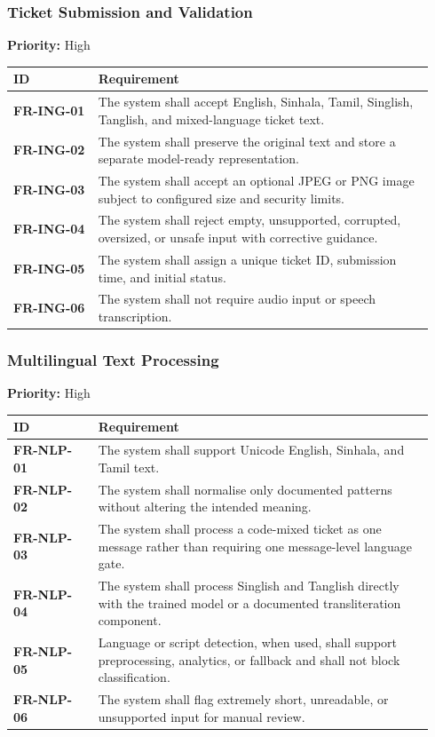 \documentclass[10pt,letterpaper]{article}
\newcommand{\req}[1]{\textbf{#1}}
\newcommand{\priority}[1]{\textbf{Priority:} #1}
\newenvironment{requirements}{%
  \small\setlength{\tabcolsep}{4pt}%
  \begin{longtable}{|L{0.19\linewidth}|L{0.75\linewidth}|}
  \hline\textbf{ID} & \textbf{Requirement}\\\hline\endhead}{\hline\end{longtable}}
\newenvironment{templatebody}{\par\justifying\setlength{\emergencystretch}{3em}}{\par}
\begin{document}
\begin{templatebody}
\subsubsection{Ticket Submission and Validation}
\priority{High}
\begin{requirements}
\req{FR-ING-01} & The system shall accept English, Sinhala, Tamil, Singlish, Tanglish, and mixed-language ticket text.\\
\req{FR-ING-02} & The system shall preserve the original text and store a separate model-ready representation.\\
\req{FR-ING-03} & The system shall accept an optional JPEG or PNG image subject to configured size and security limits.\\
\req{FR-ING-04} & The system shall reject empty, unsupported, corrupted, oversized, or unsafe input with corrective guidance.\\
\req{FR-ING-05} & The system shall assign a unique ticket ID, submission time, and initial status.\\
\req{FR-ING-06} & The system shall not require audio input or speech transcription.\\
\end{requirements}

\subsubsection{Multilingual Text Processing}
\priority{High}
\begin{requirements}
\req{FR-NLP-01} & The system shall support Unicode English, Sinhala, and Tamil text.\\
\req{FR-NLP-02} & The system shall normalise only documented patterns without altering the intended meaning.\\
\req{FR-NLP-03} & The system shall process a code-mixed ticket as one message rather than requiring one message-level language gate.\\
\req{FR-NLP-04} & The system shall process Singlish and Tanglish directly with the trained model or a documented transliteration component.\\
\req{FR-NLP-05} & Language or script detection, when used, shall support preprocessing, analytics, or fallback and shall not block classification.\\
\req{FR-NLP-06} & The system shall flag extremely short, unreadable, or unsupported input for manual review.\\
\end{requirements}


\end{templatebody}
\end{document}
